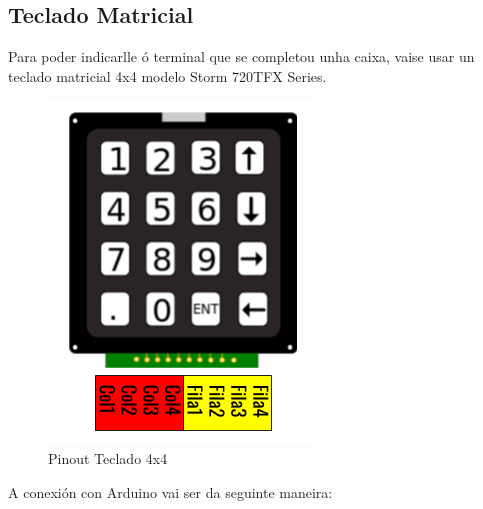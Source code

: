 \documentclass[11pt,twoside]{book}
\begin{document}
\subsection{Teclado Matricial}

Para poder indicarlle ó terminal que se completou unha caixa, vaise usar un teclado matricial 4x4 modelo Storm 720TFX Series. \cite{teclado}

\begin{figure}[H]
	\begin{center}
		\includegraphics[scale=0.6]{images/pinoutTeclado.png}
	\end{center}
	\caption{Pinout Teclado 4x4}
	\label{fig:TecladoStorm}
\end{figure}

A conexión con Arduino vai ser da seguinte maneira:
\end{document}
